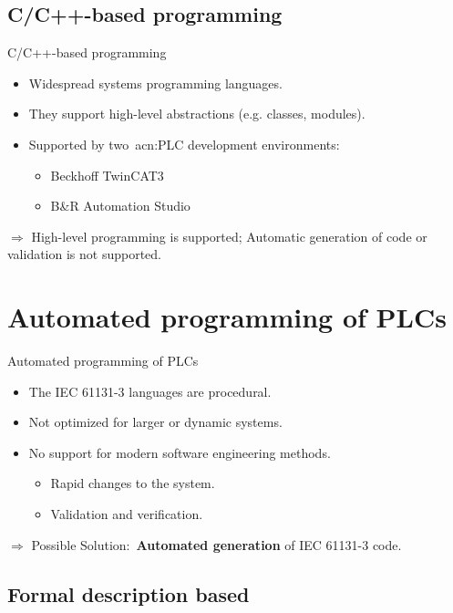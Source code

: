 \documentclass[18pt]{beamer}
\begin{document}
\subsection{C/C++-based programming}

\begin{frame}{C/C++-based programming}
\begin{itemize}
    \item Widespread systems programming languages.
    \item They support high-level abstractions (e.g. classes, modules).
    \item Supported by two~\acrshort{acn:PLC} development environments:
    \begin{itemize}
        \item Beckhoff TwinCAT3 
        \item B\&R Automation Studio
    \end{itemize}
\end{itemize}
\pause
$\Rightarrow$ High-level programming is supported; Automatic generation of code or validation is not supported.
\end{frame}

\section{Automated programming of PLCs}

\begin{frame}{Automated programming of PLCs}
    \begin{itemize}
        \item The IEC 61131-3 languages are procedural.
        \item Not optimized for larger or dynamic systems.
        \item No support for modern software engineering methods.
        \begin{itemize}
            \item Rapid changes to the system.
            \item Validation and verification.
        \end{itemize}
    \end{itemize}
    $\Rightarrow$ Possible Solution:~\textbf{Automated generation} of IEC 61131-3 code.
\end{frame}

\subsection{Formal description based}
\end{document}
